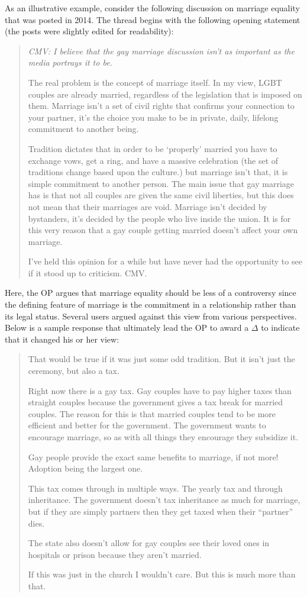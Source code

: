 As an illustrative example, consider the following discussion on marriage equality that was posted in 2014. The thread begins with the following opening statement (the posts were slightly edited for readability):
\begin{quote}\singlespacing
\emph{CMV: I believe that the gay marriage discussion isn't as important as the media portrays it to be.}

The real problem is the concept of marriage itself. In my view, LGBT couples are already married, regardless of the legislation that is imposed on them. Marriage isn't a set of civil rights that confirms your connection to your partner, it's the choice you make to be in private, daily, lifelong commitment to another being.

Tradition dictates that in order to be `properly' married you have to exchange vows, get a ring, and have a massive celebration (the set of traditions change based upon the culture.) but marriage isn't that, it is simple commitment to another person. The main issue that gay marriage has is that not all couples are given the same civil liberties, but this does not mean that their marriages are void. Marriage isn't decided by bystanders, it's decided by the people who live inside the union. It is for this very reason that a gay couple getting married doesn't affect your own marriage.

I've held this opinion for a while but have never had the opportunity to see if it stood up to criticism. CMV.
\end{quote}
Here, the OP argues that marriage equality should be less of a controversy since the defining feature of marriage is the commitment in a relationship rather than its legal status. Several users argued against this view from various perspectives. Below is a sample response that ultimately lead the OP to award a $\Delta$ to indicate that it changed his or her view:
\begin{quote}\singlespacing
That would be true if it was just some odd tradition. But it isn't just the ceremony, but also a tax.

Right now there is a gay tax. Gay couples have to pay higher taxes than straight couples because the government gives a tax break for married couples. The reason for this is that married couples tend to be more efficient and better for the government. The government wants to encourage marriage, so as with all things they encourage they subsidize it.

Gay people provide the exact same benefits to marriage, if not more! Adoption being the largest one.

This tax comes through in multiple ways. The yearly tax and through inheritance. The government doesn't tax inheritance as much for marriage, but if they are simply partners then they get taxed when their ``partner'' dies. 

The state also doesn't allow for gay couples see their loved ones in hospitals or prison because they aren't married.

If this was just in the church I wouldn't care. But this is much more than that.
\end{quote}
